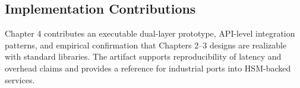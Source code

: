 \subsection{Implementation Contributions}

\indent Chapter 4 contributes an executable dual-layer prototype, API-level integration patterns, and empirical confirmation that Chapters 2--3 designs are realizable with standard libraries. The artifact supports reproducibility of latency and overhead claims and provides a reference for industrial ports into HSM-backed services.

